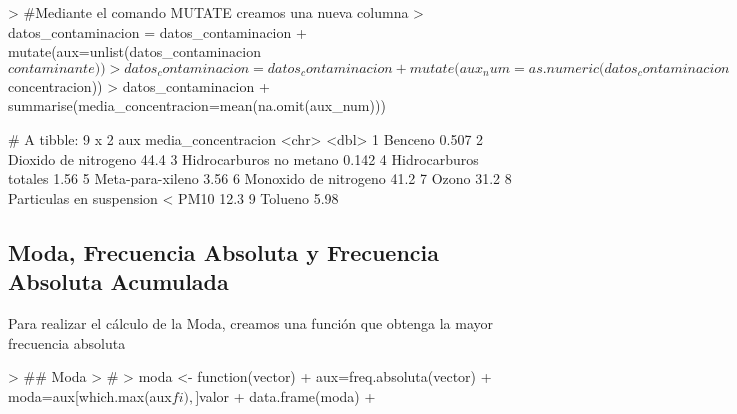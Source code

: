 \documentclass [a4paper] {article}
\begin{document}
\begin{Schunk}
\begin{Sinput}
> #Mediante el comando MUTATE creamos una nueva columna
> datos_contaminacion = datos_contaminacion %>% 
+ mutate(aux=unlist(datos_contaminacion$contaminante))
> datos_contaminacion = datos_contaminacion %>% 
+ mutate(aux_num=as.numeric(datos_contaminacion$concentracion))
> datos_contaminacion %>% group_by(aux) %>% 
+ summarise(media_concentracion=mean(na.omit(aux_num)))
\end{Sinput}
\begin{Soutput}
# A tibble: 9 x 2
  aux                             media_concentracion
  <chr>                                         <dbl>
1 Benceno                                       0.507
2 Dioxido de nitrogeno                         44.4  
3 Hidrocarburos no metano                       0.142
4 Hidrocarburos totales                         1.56 
5 Meta-para-xileno                              3.56 
6 Monoxido de nitrogeno                        41.2  
7 Ozono                                        31.2  
8 Parti­culas en suspension < PM10              12.3  
9 Tolueno                                       5.98 
\end{Soutput}
\end{Schunk}
\newpage
\subsection{Moda, Frecuencia Absoluta y Frecuencia Absoluta Acumulada}
Para realizar el cálculo de la Moda, creamos una función que obtenga la mayor frecuencia absoluta
\begin{Schunk}
\begin{Sinput}
> ## Moda
> #
> moda <- function(vector){
+ 	aux=freq.absoluta(vector)
+ 	moda=aux[which.max(aux$fi), ]$valor
+ 	data.frame(moda)
+ }
\end{Sinput}
\end{Schunk}
\end{document}
